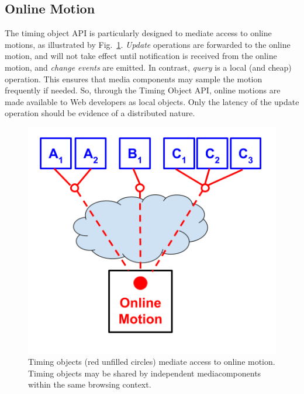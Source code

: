 \subsection{Online Motion}
\label{sec:motionsync}

The timing object API is particularly designed to mediate access to online motions,
as illustrated by Fig.~\ref{fig:model-repeat}. \emph{Update} operations are forwarded to the
online motion, and will not take effect until notification is received from
the online motion, and \emph{change events} are emitted. In contrast, \emph{query} is a local
(and cheap) operation. This ensures that media components may sample the
motion frequently if needed. So, through the Timing Object API, online motions
are made available to Web developers as local objects. Only the latency of the
update operation should be evidence of a distributed nature.

\begin{figure}[h]
\centering
\includegraphics[scale=.3]{fig/motion-model-2.png}
\caption{Timing objects (red unfilled circles) mediate access to online motion. Timing objects may be shared by independent mediacomponents within the same browsing context.}
\label{fig:model-repeat}
\end{figure}

